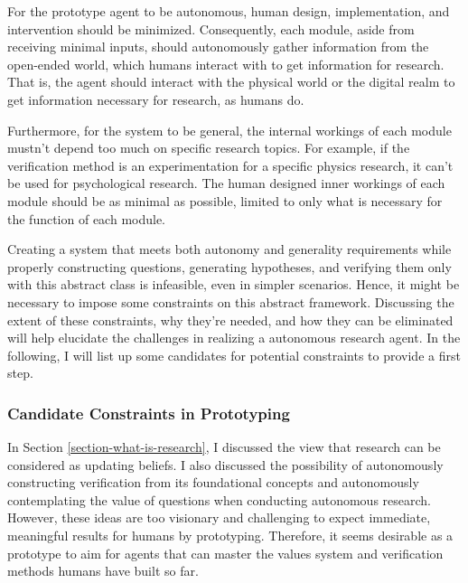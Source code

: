 For the prototype agent to be autonomous, human design, implementation, and intervention should be minimized. Consequently, each module, aside from receiving minimal inputs, should autonomously gather information from the open-ended world, which humans interact with to get information for research. That is, the agent should interact with the physical world or the digital realm to get information necessary for research, as humans do.


Furthermore, for the system to be general, the internal workings of each module mustn't depend too much on specific research topics. For example, if the verification method is an experimentation for a specific physics research, it can't be used for psychological research. The human designed inner workings of each module should be as minimal as possible, limited to only what is necessary for the function of each module. 

Creating a system that meets both autonomy and generality requirements while properly constructing questions, generating hypotheses, and verifying them only with this abstract class is infeasible, even in simpler scenarios. Hence, it might be necessary to impose some constraints on this abstract framework. Discussing the extent of these constraints, why they're needed, and how they can be eliminated will help elucidate the challenges in realizing a autonomous research agent. In the following, I will list up some candidates for potential constraints to provide a first step.

\subsubsection{Candidate Constraints in Prototyping}

In Section \ref{section-what-is-research}, I discussed the view that research can be considered as updating beliefs. I also discussed the possibility of autonomously constructing verification from its foundational concepts and autonomously contemplating the value of questions when conducting autonomous research. However, these ideas are too visionary and challenging to expect immediate, meaningful results for humans by prototyping. Therefore, it seems desirable as a prototype to aim for agents that can master the values system and verification methods humans have built so far.

